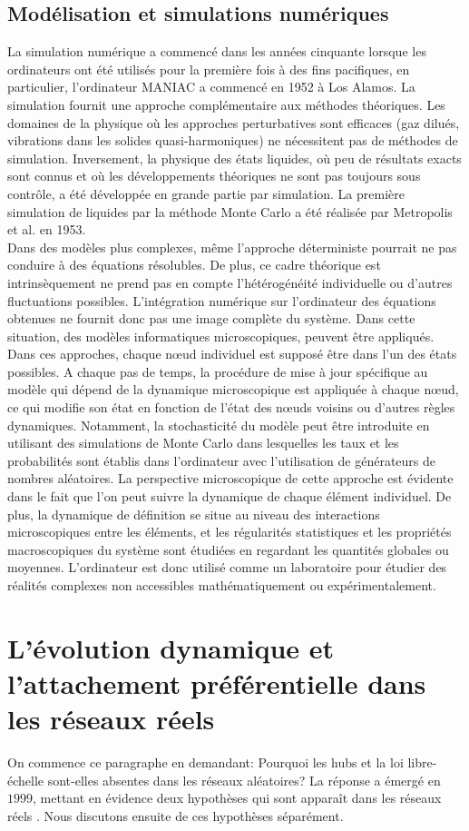 \subsection{Modélisation et simulations numériques}
La simulation numérique a commencé dans les années cinquante lorsque les ordinateurs ont été utilisés pour la première fois à des fins pacifiques, en particulier, l'ordinateur MANIAC a commencé en 1952 à Los Alamos. La simulation fournit une approche complémentaire aux méthodes théoriques. Les domaines de la physique où les approches perturbatives sont efficaces (gaz dilués, vibrations dans les solides quasi-harmoniques) ne nécessitent pas de méthodes de simulation. Inversement, la physique des états liquides, où peu de résultats exacts sont connus et où les développements théoriques ne sont pas toujours sous contrôle, a été développée en grande partie par simulation. La première simulation de liquides par la méthode Monte Carlo a été réalisée par Metropolis et al. en 1953.\\
Dans des modèles plus complexes, même l'approche déterministe pourrait ne pas conduire à des équations résolubles. De plus, ce cadre théorique est intrinsèquement ne prend pas en compte l'hétérogénéité individuelle ou d'autres fluctuations possibles. L'intégration numérique sur l'ordinateur des équations obtenues ne fournit donc pas une image complète du système. Dans cette situation, des modèles informatiques microscopiques, peuvent être appliqués.\\
Dans ces approches, chaque nœud individuel est supposé être dans l'un des états possibles. A chaque pas de temps, la procédure de mise à jour spécifique au modèle qui dépend de la dynamique microscopique est appliquée à chaque nœud, ce qui modifie son état en fonction de l'état des nœuds voisins ou d'autres règles dynamiques. Notamment, la stochasticité du modèle peut être introduite en utilisant des simulations de Monte Carlo dans lesquelles les taux et les probabilités sont établis dans l'ordinateur avec l'utilisation de générateurs de nombres aléatoires. La perspective microscopique de cette approche est évidente dans le fait que l'on peut suivre la dynamique de chaque élément individuel. De plus, la dynamique de définition se situe au niveau des interactions microscopiques entre les éléments, et les régularités statistiques et les propriétés macroscopiques du système sont étudiées en regardant les quantités globales ou moyennes. L'ordinateur est donc utilisé comme un laboratoire pour étudier des réalités complexes non accessibles mathématiquement ou expérimentalement.
\begin{sloppypar}
\section{L'évolution dynamique et l'attachement préférentielle  dans les réseaux réels}
\end{sloppypar}
On commence ce paragraphe en demandant: Pourquoi les hubs et la loi libre-échelle sont-elles absentes dans les réseaux aléatoires? La réponse a émergé en $1999$, mettant en évidence deux hypothèses qui sont apparaît dans les réseaux réels \cite{BA1999}. Nous discutons ensuite de ces hypothèses séparément.

